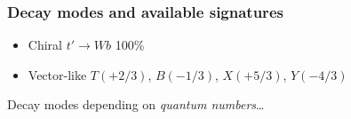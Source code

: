 \begin{frame}\frametitle{Decay modes and available signatures}
\centering
\scriptsize

\begin{minipage}{.65\textwidth}\centering
\begin{itemize}
\item Chiral $t'\to Wb$ 100\%
\item Vector-like $T(+2/3)$, $B(-1/3)$, $X(+5/3)$, $Y(-4/3)$
\end{itemize}
Decay modes depending on {\it quantum numbers}\dots
\myskip

  

\end{minipage}

\end{frame}

